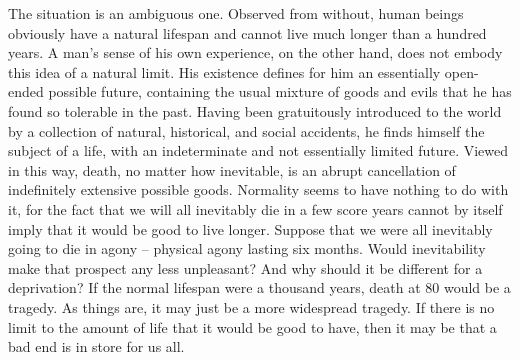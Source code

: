 The situation is an ambiguous one. Observed from without, human beings
obviously have a natural lifespan and cannot live much longer than a hundred
years. A man's sense of his own experience, on the other hand, does not
embody this idea of a natural limit. His existence defines for him an essentially
open-ended possible future, containing the usual mixture of goods and evils
that he has found so tolerable in the past. Having been gratuitously introduced
to the world by a collection of natural, historical, and social accidents, he finds
himself the subject of a life, with an indeterminate and not essentially limited
future. Viewed in this way, death, no matter how inevitable, is an abrupt
cancellation of indefinitely extensive possible goods. Normality seems to have
nothing to do with it, for the fact that we will all inevitably die in a few score
years cannot by itself imply that it would be good to live longer. Suppose that
we were all inevitably going to die in agony – physical agony lasting six months.
Would inevitability make that prospect any less unpleasant? And why should it
be different for a deprivation? If the normal lifespan were a thousand years,
death at 80 would be a tragedy. As things are, it may just be a more widespread
tragedy. If there is no limit to the amount of life that it would be good to have,
then it may be that a bad end is in store for us all.